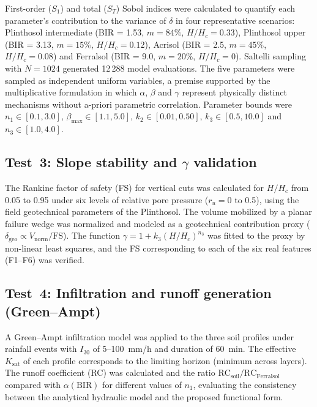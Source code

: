 \documentclass[preprint,review,12pt,authoryear]{elsarticle}
\begin{document}
First-order ($S_1$) and total ($S_T$) Sobol indices \citep{sobol_2001} were calculated to quantify each parameter's contribution to the variance of $\delta$ in four representative scenarios: Plinthosol intermediate (BIR = 1.53, $m = 84\%$, $H/H_c = 0.33$), Plinthosol upper (BIR = 3.13, $m = 15\%$, $H/H_c = 0.12$), Acrisol (BIR = 2.5, $m = 45\%$, $H/H_c = 0.08$) and Ferralsol (BIR = 9.0, $m = 20\%$, $H/H_c = 0$). Saltelli sampling \citep{saltelli_et_al_2004} with $N = 1024$ generated 12\,288 model evaluations. The five parameters were sampled as independent uniform variables, a premise supported by the multiplicative formulation in which $\alpha$, $\beta$ and $\gamma$ represent physically distinct mechanisms without a-priori parametric correlation. Parameter bounds were $n_1 \in [0.1, 3.0]$, $\beta_{\max} \in [1.1, 5.0]$, $k_2 \in [0.01, 0.50]$, $k_3 \in [0.5, 10.0]$ and $n_3 \in [1.0, 4.0]$.

\subsection{Test~3: Slope stability and $\gamma$ validation}
\label{sec:test3}

The Rankine factor of safety (FS) \citep{rankine_1857} for vertical cuts was calculated for $H/H_c$ from 0.05 to 0.95 under six levels of relative pore pressure ($r_u = 0$ to 0.5), using the field geotechnical parameters of the Plinthosol. The volume mobilized by a planar failure wedge was normalized and modeled as a geotechnical contribution proxy ($\delta_{\mathrm{geo}} \propto V_{\mathrm{norm}}/\mathrm{FS}$). The function $\gamma = 1 + k_3(H/H_c)^{n_3}$ was fitted to the proxy by non-linear least squares, and the FS corresponding to each of the six real features (F1--F6) was verified.

\subsection{Test~4: Infiltration and runoff generation (Green--Ampt)}

A Green--Ampt infiltration model \citep{green_ampt_1911} was applied to the three soil profiles under rainfall events with $I_{30}$ of 5--100~mm/h and duration of 60~min. The effective $K_{\mathrm{sat}}$ of each profile corresponds to the limiting horizon (minimum across layers). The runoff coefficient (RC) was calculated and the ratio $\mathrm{RC}_{\mathrm{soil}}/\mathrm{RC}_{\mathrm{Ferralsol}}$ compared with $\alpha(\mathrm{BIR})$ for different values of $n_1$, evaluating the consistency between the analytical hydraulic model and the proposed functional form.
\end{document}

